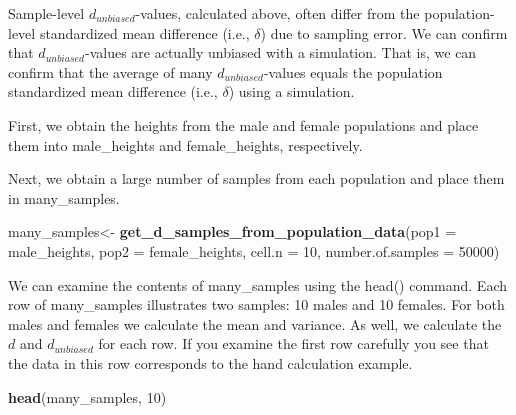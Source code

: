 \documentclass[
]{krantz}
\makeatletter
\newenvironment{Shaded}{\begin{snugshade}}{\end{snugshade}}
\newcommand{\DataTypeTok}[1]{\textcolor[rgb]{0.27,0.27,0.27}{#1}}
\newcommand{\DecValTok}[1]{\textcolor[rgb]{0.06,0.06,0.06}{#1}}
\newcommand{\KeywordTok}[1]{\textcolor[rgb]{0.27,0.27,0.27}{\textbf{#1}}}
\newcommand{\NormalTok}[1]{#1}
\newcommand{\OperatorTok}[1]{\textcolor[rgb]{0.43,0.43,0.43}{\textbf{#1}}}
\newcommand{\StringTok}[1]{\textcolor[rgb]{0.5,0.5,0.5}{#1}}
\newenvironment{kframe}{%
\medskip{}
\setlength{\fboxsep}{.8em}
 \def\at@end@of@kframe{}%
 \ifinner\ifhmode%
  \def\at@end@of@kframe{\end{minipage}}%
  \begin{minipage}{\columnwidth}%
 \fi\fi%
 \def\FrameCommand##1{\hskip\@totalleftmargin \hskip-\fboxsep
 \colorbox{shadecolor}{##1}\hskip-\fboxsep
     \hskip-\linewidth \hskip-\@totalleftmargin \hskip\columnwidth}%
 \MakeFramed {\advance\hsize-\width
   \@totalleftmargin\z@ \linewidth\hsize
   \@setminipage}}%
 {\par\unskip\endMakeFramed%
 \at@end@of@kframe}
\renewenvironment{Shaded}{\begin{kframe}}{\end{kframe}}
\makeatother
\begin{document}
Sample-level \(d_{unbiased}\)-values, calculated above, often differ from the population-level standardized mean difference (i.e., \(\delta\)) due to sampling error. We can confirm that \(d_{unbiased}\)-values are actually unbiased with a simulation. That is, we can confirm that the average of many \(d_{unbiased}\)-values equals the population standardized mean difference (i.e., \(\delta\)) using a simulation.

First, we obtain the heights from the male and female populations and place them into male\_heights and female\_heights, respectively.

\begin{Shaded}
\end{Shaded}

Next, we obtain a large number of samples from each population and place them in many\_samples.

\begin{Shaded}
\begin{Highlighting}[]
\NormalTok{many_samples<-}\StringTok{  }\KeywordTok{get_d_samples_from_population_data}\NormalTok{(}\DataTypeTok{pop1 =}\NormalTok{ male_heights,}
                                   \DataTypeTok{pop2 =}\NormalTok{ female_heights,}
                                   \DataTypeTok{cell.n =} \DecValTok{10}\NormalTok{,}
                                   \DataTypeTok{number.of.samples =} \DecValTok{50000}\NormalTok{)}
\end{Highlighting}
\end{Shaded}

We can examine the contents of many\_samples using the head() command. Each row of many\_samples illustrates two samples: 10 males and 10 females. For both males and females we calculate the mean and variance. As well, we calculate the \(d\) and \(d_{unbiased}\) for each row. If you examine the first row carefully you see that the data in this row corresponds to the hand calculation example.

\begin{Shaded}
\begin{Highlighting}[]
\KeywordTok{head}\NormalTok{(many_samples, }\DecValTok{10}\NormalTok{)}
\end{Highlighting}
\end{Shaded}
\end{document}
